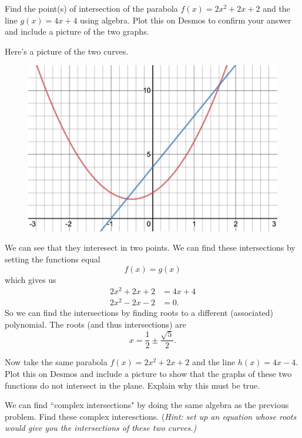 \documentclass[12pt]{article} %
\begin{document}
\newpage

\begin{problem}
    Find the point(s) of intersection of the parabola $f(x)=2x^2+2x+2$ and the line $g(x)=4x+4$ using algebra. Plot this on Desmos to confirm your answer and include a picture of the two graphs.
\end{problem}

\begin{solution}
Here's a picture of the two curves.
\begin{figure}[H]
    \centering
    \includegraphics[width=.8\textwidth]{desmos-graph.png}
\end{figure}
We can see that they interesect in two points. We can find these intersections by setting the functions equal
\[
f(x)=g(x)
\]
which gives us
\begin{align*}
    2x^2+2x+2&=4x+4\\
    2x^2-2x-2&=0.
\end{align*}
So we can find the intersections by finding roots to a different (associated) polynomial. The roots (and thus intersections) are
\[
x=\frac{1}{2}\pm \frac{\sqrt{5}}{2}.
\]
\end{solution}

\newpage

\begin{problem}
    Now take the same parabola $f(x)=2x^2+2x+2$ and the line $h(x)=4x-4$. Plot this on Desmos and include a picture to show that the graphs of these two functions do not intersect in the plane. Explain why this must be true.
    
    We can find ``complex intersections" by doing the same algebra as the previous problem. Find these complex interesctions. (\emph{Hint: set up an equation whose roots would give you the intersections of these two curves.)}
\end{problem}
\end{document}
